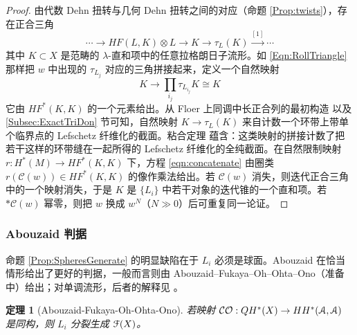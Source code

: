 \documentclass[11pt,a4paper]{article}
\numberwithin{equation}{section}
\newtheorem{Theorem}[thm]{定理}
\newcommand{\scrA}{\EuScript{A}}
\newcommand{\scrF}{\EuScript{F}}
\begin{document}
\begin{proof}
由代数 Dehn 扭转与几何 Dehn 扭转之间的对应（命题 \ref{Prop:twists}），存在正合三角
\[
\cdots \rightarrow  HF(L,K)\otimes L \rightarrow K \rightarrow \tau_L(K) \stackrel{[1]}{\longrightarrow} \cdots
\]
其中 $K \subset X$ 是范畴的 $\lambda$-直和项中的任意拉格朗日子流形。如 \eqref{Eqn:RollTriangle} 那样把 $w$ 中出现的 $\tau_{L_j}$ 对应的三角拼接起来，定义一个自然映射
\begin{equation}\label{eqn:concatenate}
K \rightarrow \prod_{i_j} \tau_{L_{i_j}} K \cong K
\end{equation}
它由 $HF^*(K,K)$ 的一个元素给出。从 Floer 上同调中长正合列的最初构造 \cite{Seidel:LES} 以及 \ref{Subsec:ExactTriDon} 节可知，自然映射 $K \rightarrow \tau_L(K)$ 来自计数一个环带上带单个临界点的 Lefschetz 纤维化的截面。粘合定理 \cite[Proposition 2.22]{Seidel:LES} 蕴含：这类映射的拼接计数了把若干这样的环带缝在一起所得的 Lefschetz 纤维化的全纯截面。在自然限制映射 $r: H^{*}(M) \rightarrow HF^{*}(K,K)$ 下，方程 \ref{eqn:concatenate} 由圈类 $r(\mathcal{C}(w)) \in HF^{*}(K,K)$ 的像作乘法给出。若 $\mathcal{C}(w)$ 消失，则迭代正合三角中的一个映射消失，于是 $K$ 是 $\{L_i\}$ 中若干对象的迭代锥的一个直和项。若 $\ast \mathcal{C}(w)$ 幂零，则把 $w$ 换成 $w^N$（$N \gg 0$）后可重复同一论证。
\end{proof}

\subsubsection{Abouzaid 判据}

命题 \ref{Prop:SpheresGenerate} 的明显缺陷在于 $L_i$ 必须是球面。Abouzaid \cite{Abouzaid:generation} 在恰当情形给出了更好的判据，一般而言则由 Abouzaid--Fukaya--Oh--Ohta--Ono（准备中）给出；对单调流形，后者的解释见 \cite{RitterSmith, Sheridan3}。

\begin{Theorem}[Abouzaid-Fukaya-Oh-Ohta-Ono] \label{Thm:AFOOOgenerate}\label{Thm:Generation}
若映射 $\mathcal{CO}: QH^*(X) \rightarrow HH^*(\scrA,\scrA)$ 是同构，则 $L_i$ 分裂生成 $\scrF(X)$。
\end{Theorem}
\end{document}
